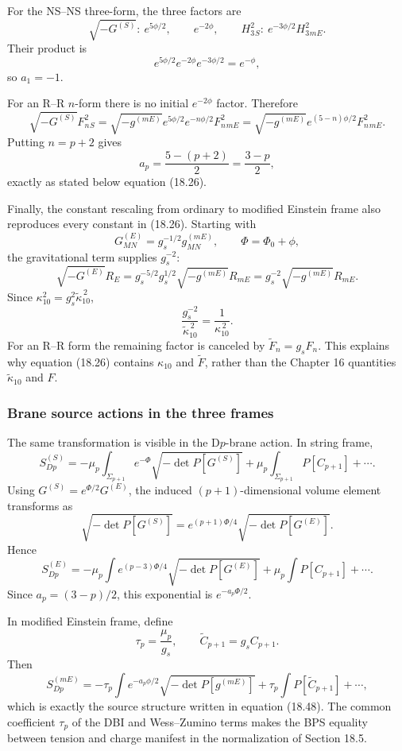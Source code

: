 \documentclass[
  10pt,
  a4paper,
  openany]{book}
\begin{document}
For the NS--NS three-form, the three factors are \[
\sqrt{-G^{(S)}}:\ e^{5\phi/2},
\qquad
e^{-2\phi},
\qquad
H_3^2{}_S:\ e^{-3\phi/2}H_3^2{}_{mE}.
\] Their product is \[
e^{5\phi/2}e^{-2\phi}e^{-3\phi/2}=e^{-\phi},
\] so \(a_1=-1\).

For an R--R \(n\)-form there is no initial \(e^{-2\phi}\) factor.
Therefore \[
\sqrt{-G^{(S)}}F_n^2{}_S
=\sqrt{-g^{(mE)}}
e^{5\phi/2}e^{-n\phi/2}F_n^2{}_{mE}
=\sqrt{-g^{(mE)}}
e^{(5-n)\phi/2}F_n^2{}_{mE}.
\] Putting \(n=p+2\) gives \[
a_p=\frac{5-(p+2)}2=\frac{3-p}{2},
\] exactly as stated below equation (18.26).

Finally, the constant rescaling from ordinary to modified Einstein frame
also reproduces every constant in (18.26). Starting with \[
G^{(E)}_{MN}=g_s^{-1/2}g^{(mE)}_{MN},
\qquad
\Phi=\Phi_0+\phi,
\] the gravitational term supplies \(g_s^{-2}\): \[
\sqrt{-G^{(E)}}R_E
=g_s^{-5/2}g_s^{1/2}\sqrt{-g^{(mE)}}R_{mE}
=g_s^{-2}\sqrt{-g^{(mE)}}R_{mE}.
\] Since \(\kappa_{10}^2=g_s^2\widetilde\kappa_{10}^{\,2}\), \[
\frac{g_s^{-2}}{\widetilde\kappa_{10}^{\,2}}
=\frac1{\kappa_{10}^{\,2}}.
\] For an R--R form the remaining factor is canceled by
\(\widetilde F_n=g_sF_n\). This explains why equation (18.26) contains
\(\kappa_{10}\) and \(\widetilde F\), rather than the Chapter 16
quantities \(\widetilde\kappa_{10}\) and \(F\).

\subsubsection{Brane source actions in the three
frames}\label{brane-source-actions-in-the-three-frames}

The same transformation is visible in the D\(p\)-brane action. In string
frame, \[
S_{Dp}^{(S)}
=-\mu_p\int_{\Sigma_{p+1}}e^{-\Phi}
\sqrt{-\det P[G^{(S)}]}
+\mu_p\int_{\Sigma_{p+1}}P[C_{p+1}]
+\cdots.
\] Using \(G^{(S)}=e^{\Phi/2}G^{(E)}\), the induced
\((p+1)\)-dimensional volume element transforms as \[
\sqrt{-\det P[G^{(S)}]}
=e^{(p+1)\Phi/4}
\sqrt{-\det P[G^{(E)}]}.
\] Hence \[
S_{Dp}^{(E)}
=-\mu_p\int e^{(p-3)\Phi/4}
\sqrt{-\det P[G^{(E)}]}
+\mu_p\int P[C_{p+1}]
+\cdots.
\] Since \(a_p=(3-p)/2\), this exponential is \(e^{-a_p\Phi/2}\).

In modified Einstein frame, define \[
\tau_p=\frac{\mu_p}{g_s},
\qquad
\widetilde C_{p+1}=g_sC_{p+1}.
\] Then \[
S_{Dp}^{(mE)}
=-\tau_p\int e^{-a_p\phi/2}
\sqrt{-\det P[g^{(mE)}]}
+\tau_p\int P[\widetilde C_{p+1}]
+\cdots,
\] which is exactly the source structure written in equation (18.48).
The common coefficient \(\tau_p\) of the DBI and Wess--Zumino terms
makes the BPS equality between tension and charge manifest in the
normalization of Section 18.5.
\end{document}
